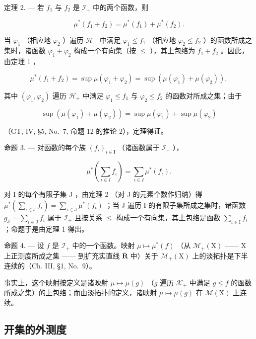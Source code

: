 定理 2. --- 若 \(f_1\) 与 \(f_2\) 是 \(\mathcal{I}_+\) 中的两个函数，则

\[
\mu^ {*} (f _ {1} + f _ {2}) = \mu^ {*} (f _ {1}) + \mu^ {*} (f _ {2}).\tag{3}
\]

当 \(\varphi_{1}\) （相应地 \(\varphi_{2}\) ）遍历 \(\mathcal{H}_{+}\) 中满足 \(\varphi_{1} \leqslant f_{1}\) （相应地 \(\varphi_{2} \leqslant f_{2}\) ）的函数所成之集时，诸函数 \(\varphi_{1} + \varphi_{2}\) 构成一个有向集（按 \(\leqslant\) ），其上包络为 \(f_{1} + f_{2}\) 。因此，由定理 1 ，

\[
\mu^ {*} (f _ {1} + f _ {2}) = \sup \mu (\varphi_ {1} + \varphi_ {2}) = \sup \left(\mu (\varphi_ {1}) + \mu (\varphi_ {2})\right),
\]

其中 \((\varphi_{1},\varphi_{2})\) 遍历 \(\mathcal{H}_{+}\) 中满足 \(\varphi_1\leqslant f_1\) 与 \(\varphi_{2}\leqslant f_{2}\) 的函数对所成之集；由于

\[
\sup \left(\mu (\varphi_ {1}) + \mu (\varphi_ {2})\right) = \sup \mu (\varphi_ {1}) + \sup \mu (\varphi_ {2})
\]

（GT, IV, §5, No.~7, 命题 12 的推论 2），定理得证。

命题 3. --- 对函数的每个族 \((f_{\iota})_{\iota \in \mathrm{I}}\) （诸函数属于 \(\mathcal{I}_{+}\) ），

\[
\mu^ {*} \left(\sum_ {\iota \in I} f _ {\iota}\right) = \sum_ {\iota \in I} \mu^ {*} (f _ {\iota}).\tag{4}
\]

对 I 的每个有限子集 J ，由定理 2 （对 J 的元素个数作归纳）得 \(\mu^{*}\left(\sum_{\iota \in \mathrm{J}}f_{\iota}\right) = \sum_{\iota \in \mathrm{J}}\mu^{*}(f_{\iota})\) ；当 J 遍历 I 的有限子集所成之集时，诸函数 \(g_{\mathrm{J}} = \sum_{\iota \in \mathrm{J}}f_{\iota}\) 属于 \(\mathcal{I}_{+}\) 且按关系 \(\leqslant\) 构成一个有向集，其上包络是函数 \(\sum_{\iota \in \mathrm{I}}f_{\iota}\) ；命题于是由定理 1 得出。

命题 4. --- 设 \(f\) 是 \(\mathcal{I}_{+}\) 中的一个函数。映射 \(\mu \mapsto \mu^{*}(f)\) （从 \(\mathcal{M}_{+}(\mathrm{X})\) —— \(\mathrm{X}\) 上正测度所成之集 —— 到扩充实直线 \(\overline{\mathbf{R}}\) 中）关于 \(\mathcal{M}_{+}(\mathrm{X})\) 上的淡拓扑是下半连续的（Ch. III, §1, No.~9）。

事实上，这个映射按定义是诸映射 \(\mu \mapsto \mu(g)\) （\(g\) 遍历 \(\mathcal{K}_{+}\) 中满足 \(g \leqslant f\) 的函数所成之集）的上包络；而由淡拓扑的定义，诸映射 \(\mu \mapsto \mu(g)\) 在 \(\mathcal{M}(\mathrm{X})\) 上连续。

\subsection{开集的外测度}

